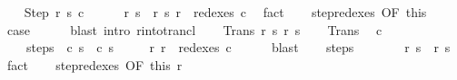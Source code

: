 \begin{isabellebody}
\ \ \isamarkupfalse%
\ {\isacharparenleft}Step\ r{\isacharprime}\ s{\isacharprime}\ c{\isacharprime}{\isacharparenright}\ \isanewline
\ \ \isamarkupfalse%
\ {\isachardoublequoteopen}{\isasymGamma}{\isasymturnstile}\ {\isacharparenleft}r{\isacharcomma}\ s{\isacharparenright}\ {\isasymrightarrow}\ {\isacharparenleft}r{\isacharprime}{\isacharcomma}\ s{\isacharprime}{\isacharparenright}{\isachardoublequoteclose}\ {\isachardoublequoteopen}r\ {\isasymin}\ redexes\ c{\isacharprime}{\isachardoublequoteclose}\ \isamarkupfalse%
\ fact{\isacharplus}\isanewline
\ \ \isamarkupfalse%
\ step{\isacharunderscore}redexes\ {\isacharbrackleft}OF\ this{\isacharbrackright}\isanewline
\ \ \isamarkupfalse%
\ {\isacharquery}case\isanewline
\ \ \ \ \isamarkupfalse%
\ {\isacharparenleft}blast\ intro{\isacharcolon}\ r{\isacharunderscore}into{\isacharunderscore}trancl{\isacharparenright}\isanewline
{}\isamarkupfalse%
\isanewline
\ \ \isamarkupfalse%
\ {\isacharparenleft}Trans\ r{\isacharprime}\ s{\isacharprime}\ r{\isacharprime}{\isacharprime}\ s{\isacharprime}{\isacharprime}{\isacharparenright}\isanewline
\ \ \isamarkupfalse%
\ Trans\ \isamarkupfalse%
\ c{\isacharprime}\ \isanewline
\ \ \ \ steps{\isacharcolon}\ {\isachardoublequoteopen}{\isasymGamma}{\isasymturnstile}\ {\isacharparenleft}c{\isacharcomma}\ s{\isacharparenright}\ {\isasymrightarrow}\isactrlsup {\isacharplus}\ {\isacharparenleft}c{\isacharprime}{\isacharcomma}\ s{\isacharprime}{\isacharparenright}{\isachardoublequoteclose}\ \isanewline
\ \ \ \ r{\isacharprime}{\isacharcolon}\ {\isachardoublequoteopen}r{\isacharprime}\ {\isasymin}\ redexes\ c{\isacharprime}{\isachardoublequoteclose}\isanewline
\ \ \ \ \isamarkupfalse%
\ blast\isanewline
\ \ \isamarkupfalse%
\ steps\isanewline
\ \ \isamarkupfalse%
\isanewline
\ \ \isamarkupfalse%
\ {\isachardoublequoteopen}{\isasymGamma}{\isasymturnstile}\ {\isacharparenleft}r{\isacharprime}{\isacharcomma}\ s{\isacharprime}{\isacharparenright}\ {\isasymrightarrow}\ {\isacharparenleft}r{\isacharprime}{\isacharprime}{\isacharcomma}\ s{\isacharprime}{\isacharprime}{\isacharparenright}{\isachardoublequoteclose}\ \isamarkupfalse%
\ fact\isanewline
\ \ \isamarkupfalse%
\ step{\isacharunderscore}redexes\ {\isacharbrackleft}OF\ this\ r{\isacharprime}{\isacharbrackright}\ \isamarkupfalse%

\end{isabellebody}

